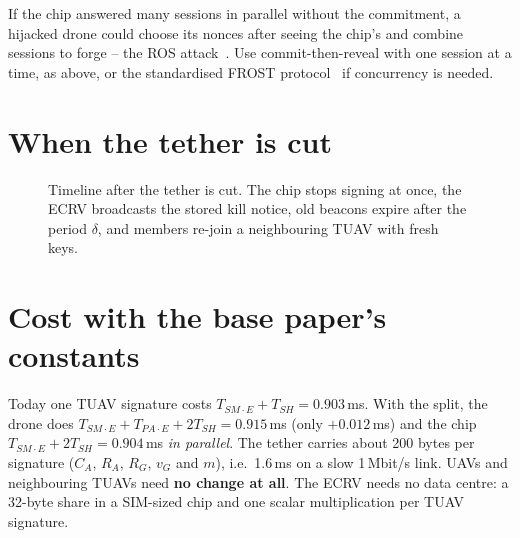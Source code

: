 \begin{remark}
If the chip answered many sessions in parallel without the commitment, a hijacked drone could choose its nonces after seeing the chip's and combine
sessions to forge -- the ROS attack~\cite{ros21}. Use commit-then-reveal with one session at a time, as above, or the standardised FROST
protocol~\cite{frost20,rfc9591} if concurrency is needed.
\end{remark}


\section{When the tether is cut}
\begin{figure}[H]
\centering
{}
\caption{Timeline after the tether is cut. The chip stops signing at once, the ECRV broadcasts the stored kill notice, old beacons expire after the period $\delta$, and members re-join a neighbouring TUAV with fresh keys.}
\label{fig:cut}
\end{figure}

\section{Cost with the base paper's constants}
Today one TUAV signature costs $T_{SM\cdot E}+T_{SH}=0.903$\,ms. With the split, the drone does $T_{SM\cdot E}+T_{PA\cdot E}+2T_{SH}=0.915$\,ms (only
$+0.012$\,ms) and the chip $T_{SM\cdot E}+2T_{SH}=0.904$\,ms \emph{in parallel}. The tether carries about 200 bytes per signature ($C_A$, $R_A$, $R_G$,
$v_G$ and $m$), i.e.\ 1.6\,ms on a slow 1\,Mbit/s link. UAVs and neighbouring TUAVs need \textbf{no change at all}. The ECRV needs no data centre: a
32-byte share in a SIM-sized chip and one scalar multiplication per TUAV signature.

